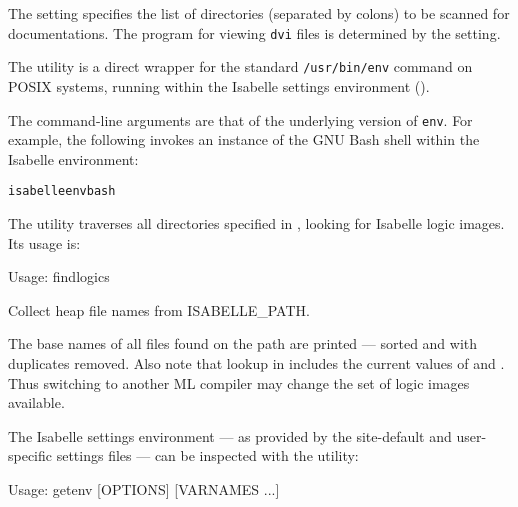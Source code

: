 \begin{isabellebody}
\begin{isamarkuptext}
  \medskip The \hyperlink{setting.ISABELLE-DOCS}{\mbox{}} setting specifies the list of
  directories (separated by colons) to be scanned for documentations.
  The program for viewing \verb|dvi| files is determined by the
  \hyperlink{setting.DVI-VIEWER}{\mbox{}} setting.%
\end{isamarkuptext}%
\isamarkuptrue%
%
\isamarkuptrue%
%
\begin{isamarkuptext}%
The \hypertarget{tool.env}{\hyperlink{tool.env}{\mbox{}}} utility is a direct wrapper for the
  standard \verb|/usr/bin/env| command on POSIX systems,
  running within the Isabelle settings environment
  ().

  The command-line arguments are that of the underlying version of
  \verb|env|.  For example, the following invokes an instance of
  the GNU Bash shell within the Isabelle environment:
\begin{alltt}
  isabelle env bash
\end{alltt}%
\end{isamarkuptext}%
\isamarkuptrue%
%
\isamarkuptrue%
%
\begin{isamarkuptext}%
The \hypertarget{tool.findlogics}{\hyperlink{tool.findlogics}{\mbox{}}} utility traverses all directories
  specified in \hyperlink{setting.ISABELLE-PATH}{\mbox{}}, looking for Isabelle logic
  images. Its usage is:
\begin{ttbox}
Usage: findlogics

  Collect heap file names from ISABELLE_PATH.
\end{ttbox}

  The base names of all files found on the path are printed --- sorted
  and with duplicates removed. Also note that lookup in \hyperlink{setting.ISABELLE-PATH}{\mbox{}} includes the current values of \hyperlink{setting.ML-SYSTEM}{\mbox{}}
  and \hyperlink{setting.ML-PLATFORM}{\mbox{}}. Thus switching to another ML compiler
  may change the set of logic images available.%
\end{isamarkuptext}%
\isamarkuptrue%
%
\isamarkuptrue%
%
\begin{isamarkuptext}%
The Isabelle settings environment --- as provided by the
  site-default and user-specific settings files --- can be inspected
  with the \hypertarget{tool.getenv}{\hyperlink{tool.getenv}{\mbox{}}} utility:
\begin{ttbox}
Usage: getenv [OPTIONS] [VARNAMES ...]


\end{ttbox}
\end{isamarkuptext}
\end{isabellebody}
